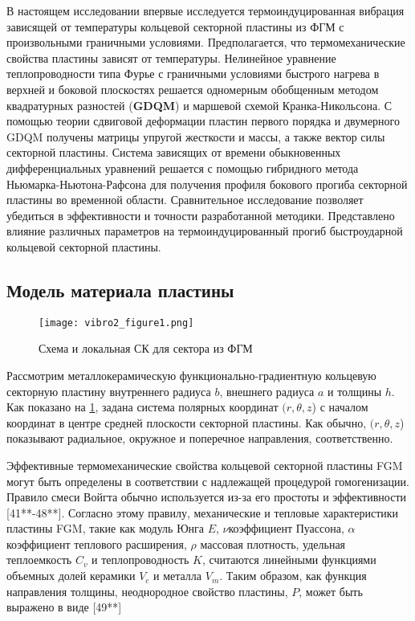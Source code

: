 В настоящем исследовании впервые исследуется термоиндуцированная вибрация зависящей от температуры кольцевой секторной пластины из ФГМ с произвольными граничными условиями. Предполагается, что термомеханические свойства пластины зависят от температуры. Нелинейное уравнение теплопроводности типа Фурье с граничными условиями быстрого нагрева в верхней и боковой плоскостях решается одномерным обобщенным методом квадратурных разностей (\textbf{GDQM}) и маршевой схемой Кранка-Никольсона. С помощью теории сдвиговой деформации пластин первого порядка и двумерного GDQM получены матрицы упругой жесткости и массы, а также вектор силы секторной пластины. Система зависящих от времени обыкновенных дифференциальных уравнений решается с помощью гибридного метода Ньюмарка-Ньютона-Рафсона для получения профиля бокового прогиба секторной пластины во временной области. Сравнительное исследование позволяет убедиться в эффективности и точности разработанной методики. Представлено влияние различных параметров на термоиндуцированный прогиб быстроударной кольцевой секторной пластины.


\subsection{Модель материала пластины}\label{ch:ch3/sec3/sub2}

\begin{figure}[h!]
	\centering
	\texttt{[image: vibro2\_figure1.png]}%
	\caption{Схема и локальная СК для сектора из ФГМ}
	\label{fig:vibro2:1}
\end{figure}

Рассмотрим металлокерамическую функционально-градиентную кольцевую секторную пластину внутреннего радиуса \(b\), внешнего радиуса \(a\) и толщины \(h\). Как показано на \cref{fig:vibro2:1}, задана система полярных координат \((r, \theta, z\)) с началом координат в центре средней плоскости секторной пластины.  Как обычно, \((r, \theta, z\)) показывают радиальное, окружное и поперечное направления, соответственно.


Эффективные термомеханические свойства кольцевой секторной пластины FGM могут быть определены в соответствии с надлежащей процедурой гомогенизации. Правило смеси Войгта обычно используется из-за его простоты и эффективности [41**-48**]. Согласно этому правилу, механические и тепловые характеристики пластины FGM, такие как модуль Юнга \(E\),  \(\nu\)коэффициент Пуассона, \(\alpha\)коэффициент теплового расширения, \(\rho\) массовая плотность, удельная теплоемкость \(C_v\) и теплопроводность \(K\), считаются линейными функциями объемных долей керамики \(V_c\) и металла \(V_m\). Таким образом, как функция направления толщины, неоднородное свойство пластины, \(P\), может быть выражено в виде [49**]

